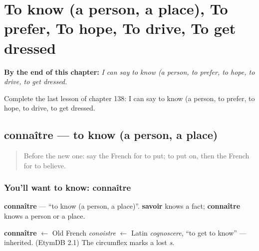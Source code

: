 
\chapter{To know (a person, a place), To prefer, To hope, To drive, To get dressed}
\label{ch:fr-to-know-a-person-a-place-to-prefer-to-hope-to-drive-to-get-dressed}

\begin{chapteropening}
\textbf{By the end of this chapter:} \emph{I can say to know (a person, to prefer, to hope, to drive, to get dressed.}

Complete the last lesson of chapter 138: I can say to know (a person, to prefer, to hope, to drive, to get dressed.
\end{chapteropening}

\section[connaître]{connaître — to know (a person, a place)}

\label{lesson:FR-C138-connaitre}



\begin{quote}
Before the new one: say the French for to put; to put on, then the French for to believe.
\end{quote}

\subsection*{You'll want to know: connaître}
\textbf{connaître} — \textquotedblleft{}to know (a person, a place)\textquotedblright{}. \textbf{savoir} knows a fact; \textbf{connaître} knows a person or a place.

\begin{cousinweb}
\textbf{connaître} $\leftarrow$ Old French \emph{conoistre} $\leftarrow$ Latin \emph{cognoscere}, \textquotedblleft{}to get to know\textquotedblright{} — inherited. (EtymDB 2.1) The circumflex marks a lost \emph{s}.
\end{cousinweb}

